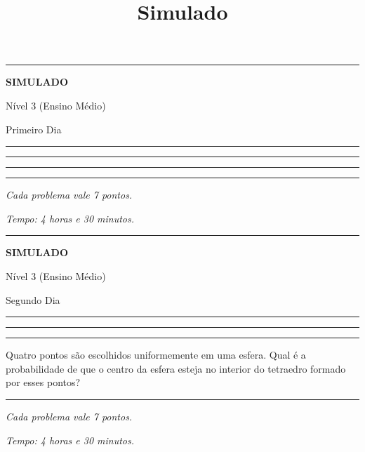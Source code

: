 \documentclass[10pt, a4paper]{article}
\title{Simulado}
\author{}
\newcommand{\rulesep}{
	\vspace{4mm}

	\hrule

	\vspace{3.5mm}
}
\begin{document}
	\pagestyle{empty}
	\hrule\vspace{.5mm}
	
	\begin{center}
		{\bfseries {\large S}{IMULADO}} \vspace{1mm}

		Nível 3 (Ensino Médio) \vspace{0.5mm}
		
		\large Primeiro Dia
	\end{center}
	
	\vspace{.5mm}\hrule
	
	\vspace{4mm}

	
	\rulesep

	
	\rulesep
	

	\rulesep

	{\hfill \slshape Cada problema vale 7 pontos.}

	{\hfill \slshape Tempo: 4 horas e 30 minutos.}

	\newpage

	\hrule\vspace{.5mm}
	
	\begin{center}
		{\bfseries {\large S}{IMULADO}} \vspace{1mm}

		Nível 3 (Ensino Médio) \vspace{0.5mm}
		
		\large Segundo Dia
	\end{center}
	
	\vspace{.5mm}\hrule
	
	\vspace{4mm}
	
	\rulesep
	\rulesep
	\begin{prob} %
		Quatro pontos são escolhidos uniformemente em uma esfera. Qual é a probabilidade de que o centro da esfera esteja no interior do tetraedro formado por esses pontos?
	\end{prob}
	\rulesep

	{\hfill \slshape Cada problema vale 7 pontos.}
	
	{\hfill \slshape Tempo: 4 horas e 30 minutos.}
\end{document}
